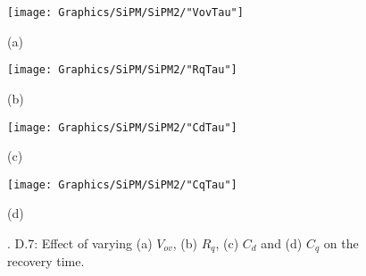 \begin{figure}[h]
    \centering
    \begin{minipage}{0.5\linewidth}
        \centering
        \texttt{[image: Graphics/SiPM/SiPM2/"VovTau"]}
        \caption*{(a)}
    \end{minipage}\hfill
    \begin{minipage}{0.5\textwidth}
        \centering
        \texttt{[image: Graphics/SiPM/SiPM2/"RqTau"]}
        \caption*{(b)}
    \end{minipage}
    \begin{minipage}{0.5\linewidth}
        \centering
        \texttt{[image: Graphics/SiPM/SiPM2/"CdTau"]}
        \caption*{(c)}
    \end{minipage}\hfill
    \begin{minipage}{0.5\textwidth}
        \centering
        \texttt{[image: Graphics/SiPM/SiPM2/"CqTau"]}
        \caption*{(d)}
    \end{minipage}
    {\caption*{\Fig. D.7: Effect of varying (a) $V_{ov}$, (b) $R_q$, (c) $C_d$ and (d) $C_q$ on the recovery time.}}
\end{figure}
